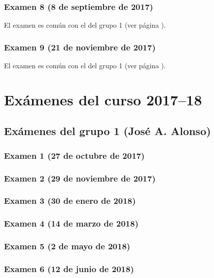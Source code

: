 \documentclass[a4paper,12pt,twoside]{book}
\begin{document}
\subsection{Examen 8 (8 de septiembre de 2017)}
El examen es común con el del grupo 1 (ver página \pageref{examen_16_17_4_8}).
\subsection{Examen 9 (21 de noviembre de 2017)}
El examen es común con el del grupo 1 (ver página \pageref{examen_16_17_4_9}).

\chapter{Exámenes del curso 2017--18}

\section{Exámenes del grupo 1 (José A. Alonso)}
\subsection{Examen 1 (27 de octubre de 2017)}
\subsection{Examen 2 (29 de noviembre de 2017)}
\subsection{Examen 3 (30 de enero de 2018)}
 \label{examen_17_18_4_3}
\subsection{Examen 4 (14 de marzo de 2018)}
\subsection{Examen 5 (2 de mayo de 2018)}
\subsection{Examen 6 (12 de junio de 2018)}
 \label{examen_17_18_4_6}
\end{document}
